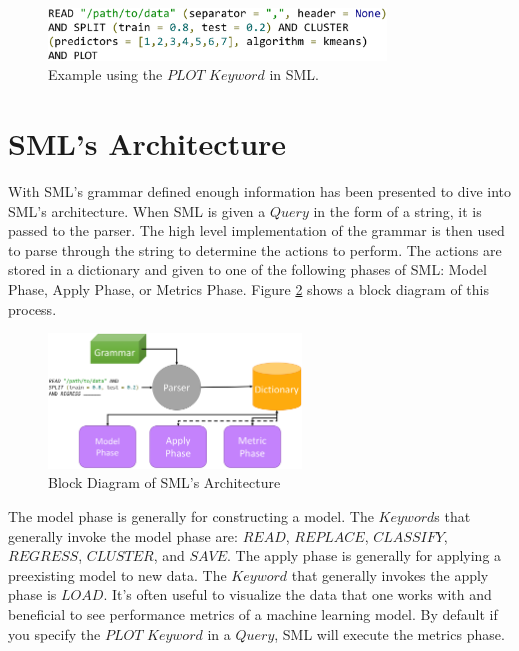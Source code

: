 \documentclass[jair,twoside,11pt,theapa]{article}
\begin{document}
\begin{figure}
\includegraphics[width=0.8\textwidth]{figs/PLOT.png}
\centering
\caption{Example using the \(PLOT\) \(Keyword\) in SML.}
\label{fig:SML:PLOT}
\end{figure}

\section{SML's Architecture}
\label{sml-architecture}

With SML's grammar defined enough information has been presented to dive into SML's architecture. When SML is given a \(Query\) in the form of a string, it is passed to the parser. The high level implementation of the grammar is then used to parse through the string to determine the actions to perform. The actions are stored in a dictionary and given to one of the following phases of SML: Model Phase, Apply Phase, or Metrics Phase. Figure \ref{fig:SML:Architecture} shows a block diagram of this process.

\begin{figure}
\includegraphics[width=0.6\textwidth]{figs/architecture.png}
\centering
\caption{Block Diagram of SML's Architecture}
\label{fig:SML:Architecture}
\end{figure}

The model phase is generally for constructing a model. The \(Keyword\)s that generally invoke the model phase are: \(READ\), \(REPLACE\), \(CLASSIFY\), \(REGRESS\), \(CLUSTER\), and \(SAVE\). The apply phase is generally for applying a preexisting model  to new data. The \(Keyword\) that generally invokes the apply phase is \(LOAD\). It's often useful to visualize the data that one works with and beneficial to see performance metrics of a machine learning model. By default if you specify the \(PLOT\) \(Keyword\) in a \(Query\), SML will execute the metrics phase.
\end{document}
